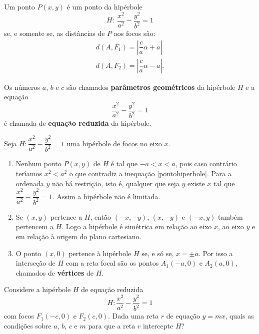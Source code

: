 \begin{proposicao}
  Um ponto $P(x, y)$ \'e um ponto da hip\'erbole
  \[
    H:\ \dfrac{x^2}{a^2} - \dfrac{y^2}{b^2} = 1
  \]
  se, e somente se, as dist\^ancias de $P$ aos focos s\~ao:
  \begin{align*}
    d(A,F_1) = \left|\dfrac{c}{a}\alpha + a\right|\\
    d(A,F_2) = \left|\dfrac{c}{a}\alpha - a\right|.
  \end{align*}
\end{proposicao}

Os n\'umeros $a$, $b$ e $c$ s\~ao chamados \textbf{par\^ametros geom\'etricos} da hip\'erbole $H$ e a equa\c{c}\~ao
\[
  \dfrac{x^2}{a^2} - \dfrac{y^2}{b^2} = 1
\]
\'e chamada de \textbf{equa\c{c}\~ao reduzida} da hip\'erbole. 

\begin{observacao}
  Seja $H : \dfrac{x^2}{a^2} - \dfrac{y^2}{b^2} = 1$ uma hip\'erbole de focos no eixo $x$.
  \begin{enumerate}
    \item Nenhum ponto $P(x,y)$ de $H$ \'e tal que $-a < x < a$, pois caso contr\'ario ter{\'\i}amos $x^2 < a^2$ o que contradiz a inequa\c{c}\~ao \eqref{pontohiperbole}. Para a ordenada $y$ n\~ao h\'a restri\c{c}\~ao, isto \'e, qualquer que seja $y$ existe $x$ tal que $\dfrac{x^2}{a^2} - \dfrac{y^2}{b^2} = 1$. Assim a hip\'erbole n\~ao \'e limitada.
    \item Se $(x,y)$ pertence a $H$, ent\~ao $(-x,-y)$, $(x,-y)$ e $(-x,y)$ tamb\'em pertencem a $H$. Logo a hip\'erbole \'e sim\'etrica em rela\c{c}\~ao ao eixo $x$, ao eixo $y$  e em rela\c{c}\~ao \`a origem do plano cartesiano.
    \item O ponto $(x,0)$ pertence \`a hip\'erbole $H$ se, e s\'o se, $x = \pm a$. Por isso a interse\c{c}\~ao de $H$ com a reta focal s\~ao os pontos $A_1(-a,0)$ e $A_2(a,0)$, chamados de \textbf{v\'ertices} de $H$.
  \end{enumerate}
\end{observacao}

Considere a hip\'erbole $H$ de equa\c{c}\~ao reduzida
\[
  H : \dfrac{x^2}{a^2} - \dfrac{y^2}{b^2} = 1
\]
com focos $F_1(-c,0)$ e $F_2(c,0)$. Dada uma reta $r$ de equa\c{c}\~ao $y = mx$, quais as condi\c{c}\~oes sobre $a$, $b$, $c$ e $m$ para que a reta $r$ intercepte $H$?

